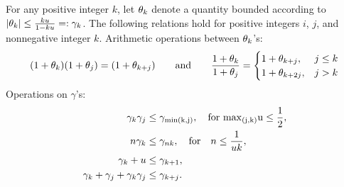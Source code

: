 \begin{lemma}
\label{lem:up}
For any positive integer $k$, let $\theta_{k}$ denote a quantity bounded according to $|\theta_{k}|\leq \frac{k u }{1-ku} =:\gamma_{k}$. The following relations hold for positive integers $i$, $j$, and nonnegative integer $k$.
Arithmetic operations between $\theta_{k}$'s: 
\begin{equation}
(1+\theta_{k})(1+\theta_{j})=(1+\theta_{k+j})\qquad \mbox{and} \qquad\frac{1+\theta_{k}}{1+\theta_{j}} =
\begin{cases}
	1+\theta_{k+j},& j \leq k\\
	1+\theta_{k+2j},& j > k\\
\end{cases} 
\end{equation}
	Operations on $\gamma$'s: 
	\begin{align*}
	\gamma_{k}\gamma_{j} &\leq \gamma_{\rm{min}(k,j)}, \quad\text{for } \rm{max}_{(j,k)} u \leq \frac{1}{2}, \\
	n\gamma_{k} &\leq \gamma_{nk}, \quad \mbox{for} \quad n \leq \frac{1}{uk},\\
	\gamma_{k} + u &\leq \gamma_{k+1}, \\ 
	\gamma_{k}+\gamma_{j}+\gamma_{k}\gamma_{j} & \leq \gamma_{k+j}.
	\end{align*}
\end{lemma}

